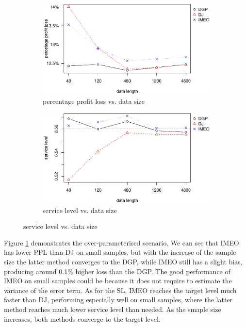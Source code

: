\documentclass{article}
\begin{document}
\begin{figure}[ht]
\centering
\caption{Performance vs. sample size with over-parameterised nonlinear model}
\begin{subfigure}[b]{0.48\textwidth}
\centering
\includegraphics[width=\textwidth]{nonSAR(2)(1)_4ppl.pdf}
\caption{percentage profit loss vs. data size}
\end{subfigure}
\hfill
\begin{subfigure}[b]{0.48\textwidth}
\centering
\includegraphics[width=\textwidth]{nonSAR(2)(1)_4sl.pdf}
\caption{service level vs. data size}
\end{subfigure}
\label{fig:misnon_over}
\end{figure}

Figure \ref{fig:misnon_over} demonstrates the over-parameterised scenario. We can see that IMEO has lower PPL than DJ on small samples, but with the increase of the sample size the latter method converges to the DGP, while IMEO still has a slight bias, producing around 0.1\% higher loss than the DGP. The good performance of IMEO on small samples could be because it does not require to estimate the variance of the error term. As for the SL, IMEO reaches the target level much faster than DJ, performing especially well on small samples, where the latter method reaches much lower service level than needed. As the smaple size increases, both methods converge to the target level.
\end{document}
